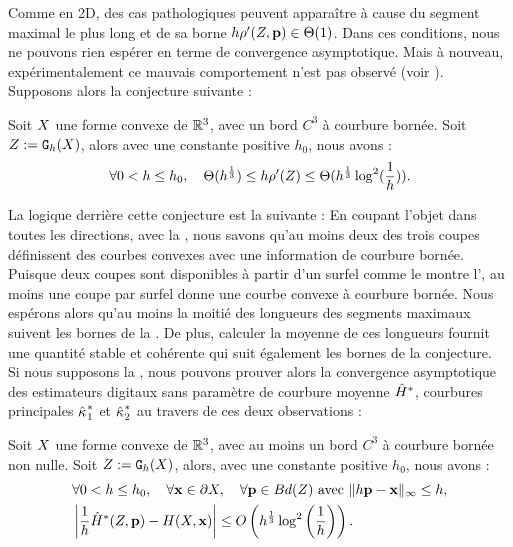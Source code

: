 %
Comme en 2D, des cas pathologiques peuvent apparaître à cause du segment maximal
le plus long et de sa borne $h\rho'(Z, \mathbf{p}) \in \Theta(1)$. Dans ces
conditions, nous ne pouvons rien espérer en terme de convergence asymptotique.
Mais à nouveau, expérimentalement ce mauvais comportement n'est pas observé
(voir ).
%
Supposons alors la conjecture suivante :
%
\begin{conjecture}
\label{conj:slice-mdss-3d}
  Soit $X$ une forme convexe de $\mathbb{R}^3$, avec un bord $C^3$ à courbure
  bornée. Soit $Z := \mathtt{G}_{h}(X)$, alors avec une constante positive $h_0$,
  nous avons :
  \begin{equation}
    \forall 0 < h \le h_0,\quad \Theta(h^{\frac{1}{3}}) \le h\rho'(Z) \le \Theta(h^{\frac{1}{3}} \log^2 (\frac{1}{h})) .
  \end{equation}
\end{conjecture}
%
La logique derrière cette conjecture est la suivante : En coupant l'objet dans
toutes les directions, avec la , nous savons
qu'au moins deux des trois coupes définissent des courbes convexes avec une
information de courbure bornée. Puisque deux coupes sont disponibles à partir
d'un surfel comme le montre l', au moins une coupe
par surfel donne une courbe convexe à courbure bornée. Nous espérons alors qu'au
moins la moitié des longueurs des segments maximaux suivent les bornes de la
. De plus, calculer la moyenne de ces
longueurs fournit une quantité stable et cohérente qui suit également les bornes
de la conjecture.
%
\\
%
Si nous supposons la , nous pouvons prouver
alors la convergence asymptotique des estimateurs digitaux sans paramètre de
courbure moyenne $\hat{H}^{*}$, courbures principales $\hat{\kappa_{}}_{1}^{*}$ et
$\hat{\kappa_{}}_{2}^{*}$ au travers de ces deux observations :
%
\begin{observation}
  \label{obs:curvature-estimator-3d-mean-pf-conv}
  Soit $X$ une forme convexe de $\mathbb{R}^3$, avec au moins un bord $C^3$ à
  courbure bornée non nulle. Soit $Z := \mathtt{G}_{h}(X)$, alors, avec une
  constante positive $h_0$, nous avons :
  \begin{align}
    &\forall 0 < h \le h_0, \quad \forall \mathbf{x} \in \partial X, \quad \forall \mathbf{p} \in Bd({Z}) \text{~avec~} \| h\mathbf{p} -\mathbf{x}\|_\infty \le h, \nonumber\\
    &\left | \frac{1}{h}\hat{H}^{*}(Z,\mathbf{p}) - H(X,\mathbf{x}) \right| \le O\left( h^{\frac{1}{3}} \log^2 \left(\frac{1}{h}\right)\right) .
  \end{align}
\end{observation}
